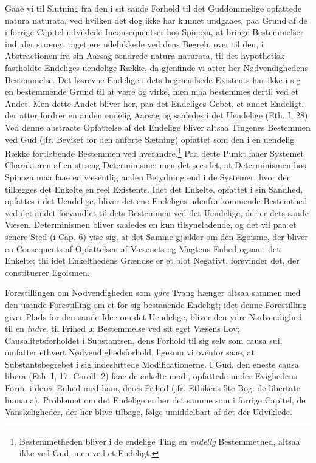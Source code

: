 \documentclass[12pt,a4paper]{book}
\newcommand{\opage}[1]{\marginnote{\footnotesize\textit{[#1]}}}
\begin{document}
Gaae vi til Slutning fra den i sit sande Forhold til det
Guddommelige opfattede natura naturata, ved hvilken det dog ikke
har kunnet undgaaes, paa Grund af de i forrige Capitel udviklede
Inconsequentser hos Spinoza, at bringe Bestemmelser ind, der
strængt taget ere udelukkede ved dens Begreb, over til den, i
Abstractionen fra sin Aarsag sondrede natura naturata, til det
hypothetisk fastholdte Endeliges uendelige Række, da gjenfinde vi
atter her Nødvendighedens Bestemmelse. Det løsrevne Endelige i
dets begrændsede Existents har ikke i sig en bestemmende Grund
til at være og virke, men maa bestemmes dertil ved et Andet. Men
dette Andet bliver her, paa det Endeliges Gebet, et andet
Endeligt, der atter fordrer en anden endelig Aarsag og saaledes i
det Uendelige (Eth. I, 28). Ved denne abstracte Opfattelse af det
Endelige bliver altsaa Tingenes Bestemmen ved Gud (jfr. Beviset
for den anførte Sætning) opfattet som den i en uendelig Række
fortløbende Bestemmen ved hverandre.\footnote{Bestemmetheden
bliver i de endelige Ting en \textit{endelig} Bestemmethed, altsaa ikke
ved Gud, men ved et Endeligt.} Paa dette Punkt faaer Systemet
Charakteren af en stræng Determinisme; men det sees let, at
Determinismen hos Spinoza maa faae en væsentlig anden Betydning
end i de Systemer, hvor der tillægges det Enkelte en reel
Existents. Idet det Enkelte, opfattet i sin Sandhed, opfattes i
det Uendelige, bliver det ene Endeliges udenfra kommende
Bestemthed ved det andet forvandlet til dets Bestemmen ved det
Uendelige, der er dets sande Væsen. Determinismen bliver saaledes
en kun tilsyneladende, og
\opage{71} %
det vil paa et senere Sted (i Cap. 6) vise sig, at det Samme
gjælder om den Egoisme, der bliver en Consequents af Opfattelsen
af Væsenets og Magtens Enhed ogsaa i det Enkelte; thi idet
Enkelthedens Grændse er et blot Negativt, forsvinder det, der
constituerer Egoismen.

Forestillingen om Nødvendigheden som \emph{ydre} Tvang hænger altsaa
sammen med den usande Forestilling om et for sig bestaaende
Endeligt; idet denne Forestilling giver Plads for den sande Idee
om det Uendelige, bliver den ydre Nødvendighed til en \emph{indre}, til
Frihed ɔ: Bestemmelse ved sit eget Væsens Lov; Causalitetsforholdet
i Substantsen, dens Forhold til sig selv som causa sui, omfatter
ethvert Nødvendighedsforhold, ligesom vi ovenfor saae, at
Substantsbegrebet i sig indesluttede Modificationerne. I Gud, den
eneste causa libera (Eth. I, 17. Coroll. 2) faae de enkelte modi,
opfattede under Evighedens Form, i deres Enhed med ham, deres
Frihed (jfr. Ethikens 5te Bog: de libertate humana). Problemet om
det Endelige er her det samme som i forrige Capitel, de
Vanskeligheder, der her blive tilbage, følge umiddelbart af det
der Udviklede.
\end{document}
